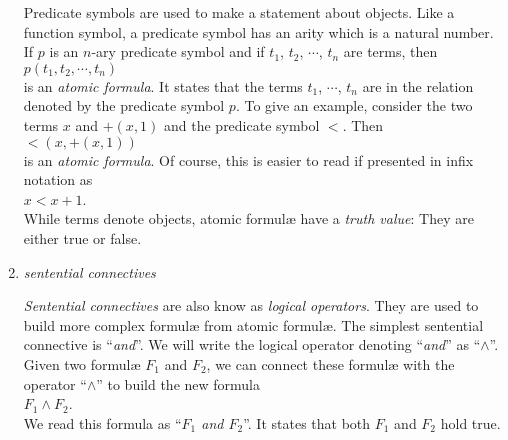 \begin{enumerate}
      Predicate symbols are used to make a statement about objects.  Like a function symbol,
      a predicate symbol has an arity which is a natural number.  If $p$ is an $n$-ary
      predicate symbol and if $t_1$, $t_2$, $\cdots$, $t_n$ are terms, then
      \\[0.2cm]
      \hspace*{1.3cm}
      $p(t_1, t_2, \cdots, t_n)$
      \\[0.2cm]
      is an \emph{atomic formula}.  It states that the terms $t_1$, $\cdots$, $t_n$ are in
      the relation denoted by the predicate symbol $p$.  To give an example, consider the
      two terms $x$ and $+(x,1)$ and the predicate symbol $<$.
      Then
      \\[0.2cm]
      \hspace*{1.3cm}
      $<(x, +(x,1))$
      \\[0.2cm]
      is an \emph{atomic formula}. Of course, this is easier to read if presented in infix notation as
      \\[0.2cm]
      \hspace*{1.3cm}
      $x < x + 1$.
      \\[0.2cm]
      While terms denote objects, atomic {formul\ae} have a \emph{truth value}:  They are
      either true or false.
\item \emph{sentential connectives}

      \emph{Sentential connectives} are also know as \emph{logical operators}.
      They are used to build more complex {formul\ae} from atomic {formul\ae}.
      The simplest sentential connective is ``\emph{and}''.  We will write the logical
      operator denoting ``\emph{and}'' as ``$\wedge$''.  Given two {formul\ae} $F_1$ and
      $F_2$, we can connect these  {formul\ae} with the operator ``$\wedge$'' to build the
      new formula
      \\[0.2cm]
      \hspace*{1.3cm}
      $F_1 \wedge F_2$.
      \\[0.2cm]
      We read this formula as ``\emph{$F_1$ and $F_2$}''.  It states that both $F_1$ and
      $F_2$ hold true.
      

\end{enumerate}
